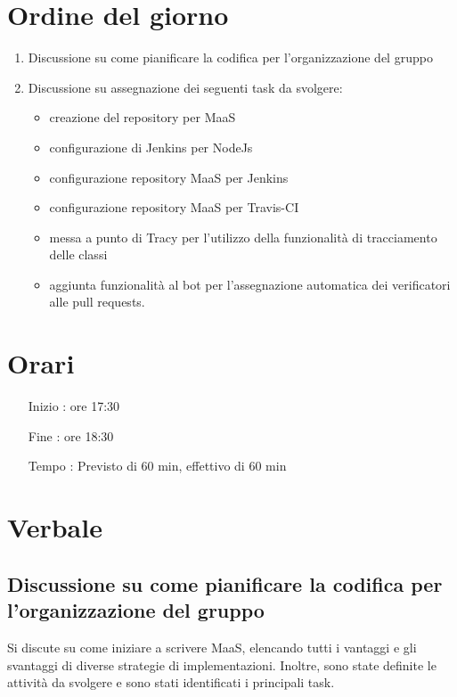 \documentclass[11pt]{meetingmins}
\begin{document}
\maketitle

\section{Ordine del giorno}

\begin{enumerate}

\item Discussione su come pianificare la codifica per l'organizzazione del gruppo
\item Discussione su assegnazione dei seguenti task da svolgere:
  
  \begin{itemize}

  \item creazione del repository per MaaS
  \item configurazione di Jenkins per NodeJs
  \item configurazione repository MaaS per Jenkins
  \item configurazione repository MaaS per Travis-CI
  \item messa a punto di Tracy per l'utilizzo della funzionalità di tracciamento delle classi
  \item aggiunta funzionalità al bot per l'assegnazione automatica dei verificatori alle pull requests.
  \end{itemize}

\end{enumerate}

\section{Orari}

\begin{itemize}
\item[Inizio]: ore 17:30
\item[Fine]: ore 18:30
\item[Tempo]: Previsto di 60 min, effettivo di 60 min

\end{itemize}

\section{Verbale}

\subsection{Discussione su come pianificare la codifica per l'organizzazione del gruppo}

Si discute su come iniziare a scrivere MaaS, elencando tutti i vantaggi e gli svantaggi di diverse strategie di implementazioni. Inoltre, sono state definite le attività da svolgere e sono stati identificati i principali task.

\end{document}
